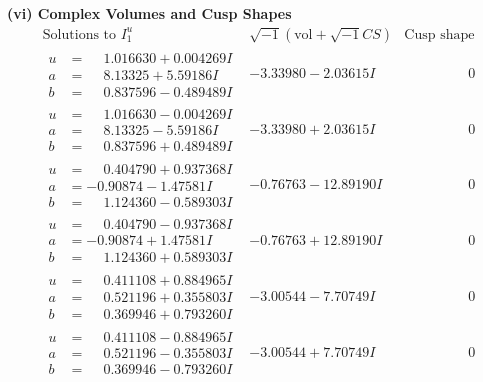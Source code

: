 \documentclass[1p]{elsarticle_modified}
\theoremstyle{definition}
\newcommand{\I}{\sqrt{-1}}
\begin{document}
\newpage\flushleft \textbf{(vi) Complex Volumes and Cusp Shapes}
$$\begin{array}{c|c|c}  
\text{Solutions to }I^u_{1}& \I (\text{vol} + \sqrt{-1}CS) & \text{Cusp shape}\\
 \hline 
\begin{aligned}
u &= \phantom{-}1.016630 + 0.004269 I \\
a &= \phantom{-}8.13325 + 5.59186 I \\
b &= \phantom{-}0.837596 - 0.489489 I\end{aligned}
 & -3.33980 - 2.03615 I & \phantom{-0.000000 } 0 \\ \hline\begin{aligned}
u &= \phantom{-}1.016630 - 0.004269 I \\
a &= \phantom{-}8.13325 - 5.59186 I \\
b &= \phantom{-}0.837596 + 0.489489 I\end{aligned}
 & -3.33980 + 2.03615 I & \phantom{-0.000000 } 0 \\ \hline\begin{aligned}
u &= \phantom{-}0.404790 + 0.937368 I \\
a &= -0.90874 - 1.47581 I \\
b &= \phantom{-}1.124360 - 0.589303 I\end{aligned}
 & -0.76763 - 12.89190 I & \phantom{-0.000000 } 0 \\ \hline\begin{aligned}
u &= \phantom{-}0.404790 - 0.937368 I \\
a &= -0.90874 + 1.47581 I \\
b &= \phantom{-}1.124360 + 0.589303 I\end{aligned}
 & -0.76763 + 12.89190 I & \phantom{-0.000000 } 0 \\ \hline\begin{aligned}
u &= \phantom{-}0.411108 + 0.884965 I \\
a &= \phantom{-}0.521196 + 0.355803 I \\
b &= \phantom{-}0.369946 + 0.793260 I\end{aligned}
 & -3.00544 - 7.70749 I & \phantom{-0.000000 } 0 \\ \hline\begin{aligned}
u &= \phantom{-}0.411108 - 0.884965 I \\
a &= \phantom{-}0.521196 - 0.355803 I \\
b &= \phantom{-}0.369946 - 0.793260 I\end{aligned}
 & -3.00544 + 7.70749 I & \phantom{-0.000000 } 0 \\ \hline\begin{aligned}

\end{aligned}
\end{array}$$
\end{document}

